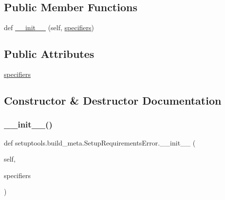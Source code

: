 \subsection*{Public Member Functions}
\begin{DoxyCompactItemize}
\item 
def \hyperlink{classsetuptools_1_1build__meta_1_1SetupRequirementsError_a02692bc734258a3cfbe2d44c32ee1f25}{\+\_\+\+\_\+init\+\_\+\+\_\+} (self, \hyperlink{classsetuptools_1_1build__meta_1_1SetupRequirementsError_ab8d760d963fece58db336de3d5444615}{specifiers})
\end{DoxyCompactItemize}
\subsection*{Public Attributes}
\begin{DoxyCompactItemize}
\item 
\hyperlink{classsetuptools_1_1build__meta_1_1SetupRequirementsError_ab8d760d963fece58db336de3d5444615}{specifiers}
\end{DoxyCompactItemize}


\subsection{Constructor \& Destructor Documentation}
\mbox{\label{classsetuptools_1_1build__meta_1_1SetupRequirementsError_a02692bc734258a3cfbe2d44c32ee1f25}} 
\subsubsection{\texorpdfstring{\+\_\+\+\_\+init\+\_\+\+\_\+()}{\_\_init\_\_()}}
{\footnotesize\ttfamily def setuptools.\+build\+\_\+meta.\+Setup\+Requirements\+Error.\+\_\+\+\_\+init\+\_\+\+\_\+ (\begin{DoxyParamCaption}\item[{}]{self,  }\item[{}]{specifiers }\end{DoxyParamCaption})}



